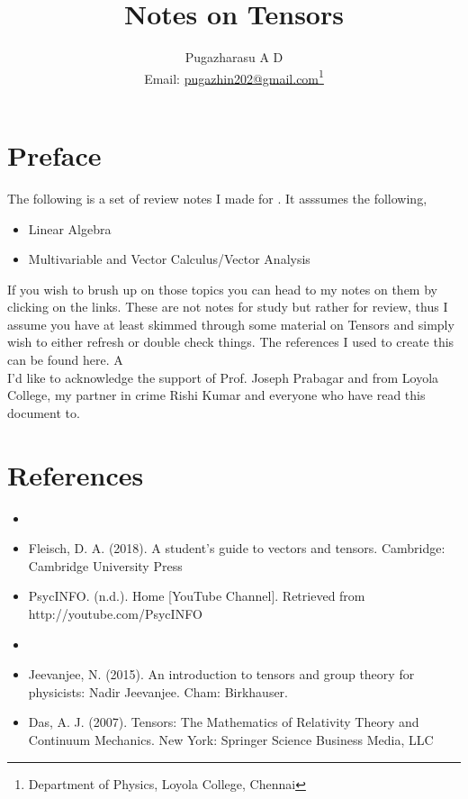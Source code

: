 \documentclass[a4paper,12pt]{book}
\begin{document}
\title{Notes on  Tensors}
\author{Pugazharasu A D \\
	Email: \href{mailto:pugazhin202@gmail.com}{pugazhin202@gmail.com}\footnote{Department of Physics, Loyola College, Chennai}}


\frontmatter
\maketitle 
\nopagebreak
\tableofcontents

\mainmatter

\chapter*{Preface}
The following is a set of review notes I made for . It asssumes the following,
\begin{itemize}
	\item Linear Algebra
	\item Multivariable and Vector Calculus/Vector Analysis
\end{itemize}
If you wish to brush up on those topics you can head to my notes on them by clicking on the links. These are not notes for study but rather for review, thus I assume you have at least skimmed through some material on Tensors and simply wish to either refresh or double check things. The references I used to create this can be found here. A \\
 I'd like to acknowledge the support of Prof. Joseph Prabagar and from Loyola College, my partner in crime Rishi Kumar and everyone who have read this document to. 


\chapter*{References}
\begin{itemize}
	\item 
	\item Fleisch, D. A. (2018). A student's guide to vectors and tensors. Cambridge: Cambridge University Press
	\item PsycINFO. (n.d.). Home [YouTube Channel]. Retrieved from http://youtube.com/PsycINFO
	\item 
	\item Jeevanjee, N. (2015). An introduction to tensors and group theory for physicists: Nadir Jeevanjee. Cham: Birkhauser.
	\item Das, A. J. (2007). Tensors: The Mathematics of Relativity Theory and Continuum Mechanics. New York: Springer Science Business Media, LLC
\end{itemize}

\backmatter
\end{document}
